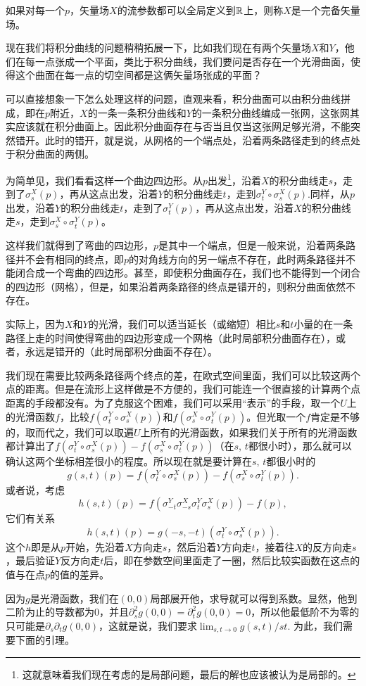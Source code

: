 如果对每一个$p$，矢量场$X$的流参数都可以全局定义到$\mathbb{R}$上，则称$X$是一个完备矢量场。

\begin{para}
现在我们将积分曲线的问题稍稍拓展一下，比如我们现在有两个矢量场$X$和$Y$，他们在每一点张成一个平面，类比于积分曲线，我们要问是否存在一个光滑曲面，使得这个曲面在每一点的切空间都是这俩矢量场张成的平面？

可以直接想象一下怎么处理这样的问题，直观来看，积分曲面可以由积分曲线拼成，即在$p$附近，$X$的一条一条积分曲线和$Y$的一条积分曲线编成一张网，这张网其实应该就在积分曲面上。因此积分曲面存在与否当且仅当这张网足够光滑，不能突然错开。此时的错开，就是说，从网格的一个端点处，沿着两条路径走到的终点处于积分曲面的两侧。

为简单见，我们看看这样一个曲边四边形。从$p$出发\footnote{这就意味着我们现在考虑的是局部问题，最后的解也应该被认为是局部的。}，沿着$X$的积分曲线走$s$，走到了$\sigma^X_s(p)$，再从这点出发，沿着$Y$的积分曲线走$t$，走到$\sigma^Y_t\circ\sigma^X_s(p)$.同样，从$p$出发，沿着$Y$的积分曲线走$t$，走到了$\sigma^Y_t(p)$，再从这点出发，沿着$X$的积分曲线走$s$，走到$\sigma^X_s\circ\sigma^Y_t(p)$。

这样我们就得到了弯曲的四边形，$p$是其中一个端点，但是一般来说，沿着两条路径并不会有相同的终点，即$p$的对角线方向的另一端点不存在，此时两条路径并不能闭合成一个弯曲的四边形。甚至，即使积分曲面存在，我们也不能得到一个闭合的四边形（网格），但是，如果沿着两条路径的终点是错开的，则积分曲面依然不存在。

实际上，因为$X$和$Y$的光滑，我们可以适当延长（或缩短）相比$s$和$t$小量的在一条路径上走的时间使得弯曲的四边形变成一个网格（此时局部积分曲面存在），或者，永远是错开的（此时局部积分曲面不存在）。

我们现在需要比较两条路径两个终点的差，在欧式空间里面，我们可以比较这两个点的距离。但是在流形上这样做是不方便的，我们可能连一个很直接的计算两个点距离的手段都没有。为了克服这个困难，我们可以采用“表示”的手段，取一个$U$上的光滑函数$f$，比较$f(\sigma^Y_t\circ\sigma^X_s(p))$和$f(\sigma^X_s\circ\sigma^Y_t(p))$。但光取一个$f$肯定是不够的，取而代之，我们可以取遍$U$上所有的光滑函数，如果我们关于所有的光滑函数都计算出了$f(\sigma^Y_t\circ\sigma^X_s(p))-f(\sigma^X_s\circ\sigma^Y_t(p))$（在$s$, $t$都很小时），那么就可以确认这两个坐标相差很小的程度。所以现在就是要计算在$s$, $t$都很小时的
\[
	g(s,t)(p)=f(\sigma^Y_t\circ\sigma^X_s(p))-f(\sigma^X_s\circ\sigma^Y_t(p)).
\]
或者说，考虑
\[
	h(s,t)(p)=f(\sigma^Y_{-t}\sigma^X_{-s}\sigma^Y_{t}\sigma^X_{s}(p))-f(p),
\]
它们有关系
\[
	h(s,t)(p)=g(-s,-t)\left(\sigma^Y_t\circ\sigma^X_s(p)\right).
\]
这个$h$即是从$p$开始，先沿着$X$方向走$s$，然后沿着$Y$方向走$t$，接着往$X$的反方向走$s$，最后验证$Y$反方向走$t$后，即在参数空间里面走了一圈，然后比较实函数在这点的值与在点$p$的值的差异。

因为$g$是光滑函数，我们在$(0,0)$局部展开他，求导就可以得到系数。显然，他到二阶为止的导数都为$0$，并且$\partial_s^2g(0,0)=\partial_t^2g(0,0)=0$，所以他最低阶不为零的只可能是$\partial_s\partial_t g(0,0)$，这就是说，我们要求$\lim_{s,t\to 0}g(s,t)/st$. 为此，我们需要下面的引理。
\end{para}

